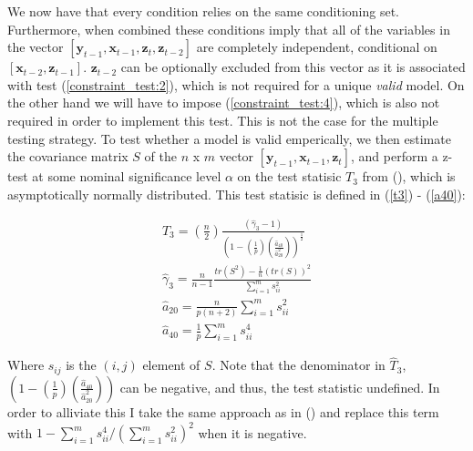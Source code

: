 \documentclass{article}
\begin{document}
We now have that every condition relies on the same conditioning set. Furthermore, when combined these conditions imply that all of the variables in the vector $[\mathbf{y}_{t-1}, \mathbf{x}_{t-1}, \mathbf{z}_{t}, \mathbf{z}_{t-2}]$ are completely independent, conditional on $[\mathbf{x}_{t-2}, \mathbf{z}_{t-1}]$. $\mathbf{z}_{t-2}$ can be optionally excluded from this vector as it is associated with test (\ref{constraint_test:2}), which is not required for a unique \textit{valid} model. On the other hand we will have to impose (\ref{constraint_test:4}), which is also not required in order to implement this test. This is not the case for the multiple testing strategy. To test whether a model is valid emperically, we then estimate the covariance matrix $S$ of the $n$ x $m$ vector $[\mathbf{y}_{t-1}, \mathbf{x}_{t-1}, \mathbf{z}_{t}]$, and perform a z-test at some nominal significance level $\alpha$ on the test statisic $T_3$ from \citeauthor{srivastava2005some} (\citeyear{srivastava2005some}), which is asymptotically normally distributed. This test statisic is defined in (\ref{t3}) - (\ref{a40}):

\begin{align}
  \hat{T}_3 = \left(\frac{n}2{}\right)\frac{(\hat{\gamma}_3-1)}{\left(1-\left(\frac{1}{p}\right)\left(\frac{\hat{a}_{40}}{\hat{a}^2_{20}}\right)\right)^\frac{1}{2}} \label{t3} \\
  \hat{\gamma}_3 = \frac{n}{n-1}\frac{tr(S^2) - \frac{1}{n}(tr(S))^2}{\sum_{i=1}^ms^2_{ii}} \\
  \hat{a}_{20} = \frac{n}{p(n+2)}\sum_{i=1}^ms^2_{ii} \\
  \hat{a}_{40} = \frac{1}{p}\sum_{i=1}^ms^4_{ii} \label{a40}
\end{align}

Where $s_{ij}$ is the $(i,j)$ element of $S$. Note that the denominator in $\hat{T}_3$, $\left(1-\left(\frac{1}{p}\right)\left(\frac{\hat{a}_{40}}{\hat{a}^2_{20}}\right)\right)$ can be negative, and thus, the test statistic undefined. In order to alliviate this I take the same approach as in \citeauthor{wang2013necessary} (\citeyear{wang2013necessary}) and replace this term with $1-\sum_{i=1}^ms^4_{ii}/\left(\sum_{i=1}^ms^2_{ii}\right)^2$ when it is negative.
\end{document}
